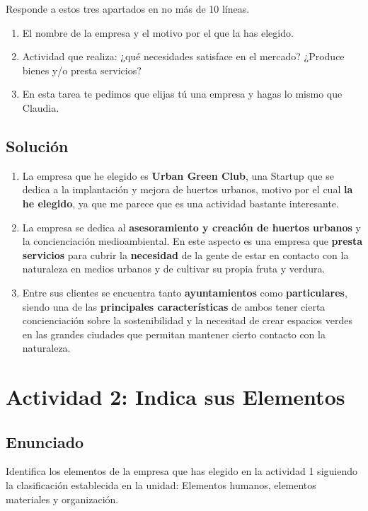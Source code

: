 Responde a estos tres apartados en no más de 10 líneas.

\begin{enumerate}[label=\roman*.]
    \item El nombre de la empresa y el motivo por el que la has elegido.
    \item Actividad que realiza: ¿qué necesidades satisface en el mercado? ¿Produce bienes y/o presta servicios?
    \item En esta tarea te pedimos que elijas tú una empresa y hagas lo mismo que Claudia.
\end{enumerate}

\subsection{Solución}
\begin{enumerate}[label=\roman*.]
    \item La empresa que he elegido es \textbf{Urban Green Club}, una Startup que se dedica a la implantación y mejora de huertos urbanos, motivo por el cual \textbf{la he elegido}, ya que me parece que es una actividad bastante interesante.

    \item La empresa se dedica al \textbf{asesoramiento y creación de huertos urbanos} y la concienciación medioambiental. En este aspecto es una empresa que \textbf{presta servicios} para cubrir la \textbf{necesidad} de la gente de estar en contacto con la naturaleza en medios urbanos y de cultivar su propia fruta y verdura.

    \item Entre sus clientes se encuentra tanto \textbf{ayuntamientos} como \textbf{particulares}, siendo una de las \textbf{principales características} de ambos tener cierta concienciación sobre la sostenibilidad y la necesitad de crear espacios verdes en las grandes ciudades que permitan mantener cierto contacto con la naturaleza.
\end{enumerate}

\section{Actividad 2: Indica sus Elementos}

\subsection{Enunciado}
Identifica los elementos de la empresa que has elegido en la actividad 1 siguiendo la clasificación establecida en la unidad: Elementos humanos, elementos materiales y organización.

